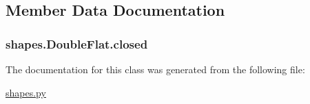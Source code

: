 \subsection{Member Data Documentation}
\hypertarget{classshapes_1_1_double_flat_a10aa68c4d2abd5f0a2ae05ef5f49520a}{}
\subsubsection[{closed}]{\setlength{\rightskip}{0pt plus 5cm}shapes.\+Double\+Flat.\+closed}\label{classshapes_1_1_double_flat_a10aa68c4d2abd5f0a2ae05ef5f49520a}


The documentation for this class was generated from the following file\+:\begin{DoxyCompactItemize}
\item 
\hyperlink{shapes_8py}{shapes.\+py}\end{DoxyCompactItemize}
